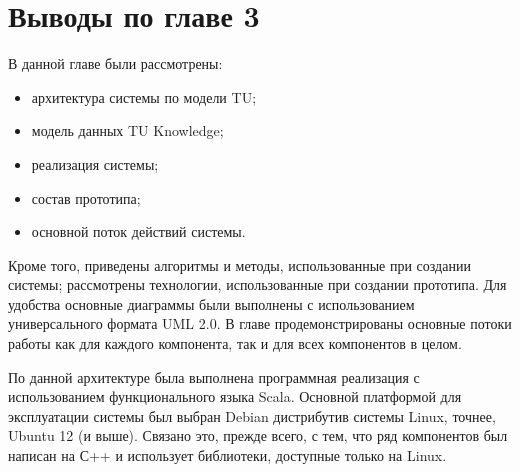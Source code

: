 \section{Выводы по главе 3}
В данной главе были рассмотрены:
\begin{itemize}
	\item архитектура системы по модели TU;
	\item модель данных TU Knowledge;
	\item реализация системы;
	\item состав прототипа;
	\item основной поток действий системы.
\end{itemize} \par
Кроме того, приведены алгоритмы и методы, использованные при создании системы; рассмотрены технологии, использованные при создании прототипа. Для удобства основные диаграммы были выполнены с использованием универсального формата UML 2.0. В главе продемонстрированы основные потоки работы как для каждого компонента, так и для всех компонентов в целом. \par
По данной архитектуре была выполнена программная реализация с использованием функционального языка Scala. Основной платформой для эксплуатации системы был выбран Debian дистрибутив системы Linux, точнее, Ubuntu 12 (и выше). Связано это, прежде всего, с тем, что ряд компонентов был написан на С++ и использует библиотеки, доступные только на Linux.    


\clearpage